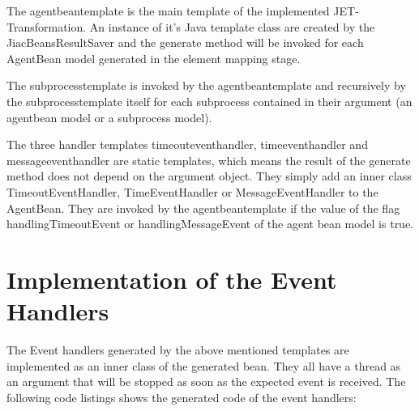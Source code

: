 The agentbeantemplate is the main template of the implemented JET-Transformation. An instance of it's Java template class are created by the JiacBeansResultSaver and the generate method will be invoked for each AgentBean model generated in the element mapping stage. 

The subprocesstemplate is invoked by the agentbeantemplate and recursively by the subprocesstemplate itself for each subprocess contained in their argument (an agentbean model or a subprocess model). 

The three handler templates timeouteventhandler, timeeventhandler and messageeventhandler are static templates, which means the result of the generate method does not depend on the argument object. They simply add an inner class TimeoutEventHandler, TimeEventHandler or MessageEventHandler to the AgentBean. They are invoked by the agentbeantemplate if the value of the flag handlingTimeoutEvent or handlingMessageEvent of the agent bean model is true.

\section{Implementation of the Event Handlers}
The Event handlers generated by the above mentioned templates are implemented as an inner class of the generated bean.
They all have a thread as an argument that will be stopped as soon as the expected event is received. The following code listings shows the generated code of the event handlers:

